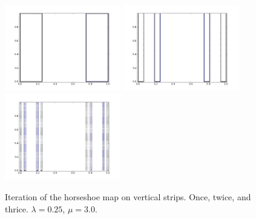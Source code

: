 \documentclass[12pt,twoside]{book}
\begin{document}
\begin{figure}[ht]
  \centering
    \includegraphics[width=0.45\textwidth]{horseshoe_v1}
    \hspace{2mm}
    \includegraphics[width=0.45\textwidth]{horseshoe_v2}
    \vspace{2mm}
    \includegraphics[width=0.45\textwidth]{horseshoe_v3}
  \caption{
    Iteration of the horseshoe map on vertical strips. Once, twice, and thrice.
    $\lambda = 0.25$, $\mu = 3.0$.
  }
  \label{fig:horseshoe-vertical}
\end{figure}
\end{document}

